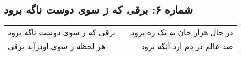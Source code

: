 \begin{center}
\section*{شماره ۶: برقی که ز سوی دوست ناگه برود}
\label{sec:006}
\begin{longtable}{l p{0.5cm} r}
برقی که ز سوی دوست ناگه برود
&&
در حال هزار جان به یک ره برود
\\
هر لحظه ز سوی اودرآید برقی
&&
صد عالم در دم آرد آنگه برود
\\
\end{longtable}
\end{center}
